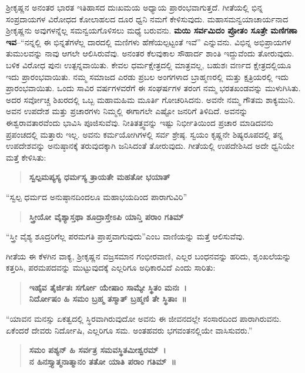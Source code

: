 ಶ‍್ರೀಕೃಷ್ಣನ ಅನಂತರ ಭಾರತ ಇತಿಹಾಸದ ದುಃಖಮಯ ಅಧ್ಯಾಯ ಪ್ರಾರಂಭವಾಗುತ್ತದೆ. ಗೀತೆಯಲ್ಲಿ ಭಿನ್ನ ಸಂಪ್ರದಾಯಗಳ ವಿರೋಧದ ಕೋಲಾಹಲದ ದೂರ ಧ್ವನಿ ನಮಗೆ ಕೇಳಿಸುವುದು. ಮಹಾಸಮನ್ವಯಾಚಾರ್ಯನಾದ ಶ‍್ರೀಕೃಷ್ಣನು ಅವುಗಳನ್ನೆಲ್ಲ ಸಮನ್ವಯಗೊಳಿಸಲು ಮಧ್ಯೆ ಬರುವನು. \textbf{ಮಯಿ ಸರ್ವಮಿದಂ ಪ್ರೋತಂ ಸೂತ್ರೇ ಮಣಿಗಣಾ ಇವ}–“ನನ್ನಲ್ಲಿ ಈ ಭಿನ್ನತೆಗಳೆಲ್ಲ ದಾರದಲ್ಲಿ ಮಣಿಗಳು ಹೆಣೆಯಲ್ಪಟ್ಟಂತೆ ಇವೆ” ಎನ್ನುವನು. ವಿಭಿನ್ನ ಅಭಿಪ್ರಾಯಗಳ ತುಮುಲವನ್ನು ನಾವು ಆಗಲೇ ಆಲಿಸಿರುವೆವು. ಅನಂತರ ಕೆಲವುಕಾಲ ಸೌಹಾರ್ದ ಶಾಂತಿ ಇದ್ದುವೆಂದು ತೋರುವುದು. ಬಳಿಕ ವಿರೋಧ ಪುನಃ ಉತ್ಪನ್ನವಾಯಿತು. ಕೇವಲ ಧರ್ಮಕ್ಷೇತ್ರದಲ್ಲಿ ಮಾತ್ರವಲ್ಲ, ಬಹುಶಃ ವರ್ಣದ ಕ್ಷೇತ್ರದಲ್ಲಿಯೂ ಇದು ಪ್ರಾರಂಭವಾಯಿತು. ನಮ್ಮ ಸಮಾಜದ ಎರಡು ಪ್ರಬಲ ಅಂಗಗಳಾದ ಬ್ರಾಹ್ಮಣರಲ್ಲಿ ಮತ್ತು ಕ್ಷತ್ರಿಯರಲ್ಲಿ ಇದು ಪ್ರಾರಂಭವಾಯಿತು. ಒಂದು ಸಾವಿರ ವರ್ಷಗಳವರೆಗೆ ಈ ಸಂಘರ್ಷಗಳ ತರಂಗ ನಮ್ಮ ಭರತಖಂಡವನ್ನು ಮುಳುಗಿಸಿತು. ಅದರ ಸರ್ವೋಚ್ಚ ಶಿಖರದಲ್ಲಿ ಒಬ್ಬ ಮಹಾಮಹಿಮ ಮೂರ್ತಿ ಗೋಚರಿಸಿದನು. ಅವನೇ ನಮ್ಮ ಗೌತಮ ಶಾಕ್ಯಮುನಿ. ಅವನ ಉಪದೇಶ ಮತ್ತು ಪ್ರಚಾರಗಳು ನಿಮ್ಮಲ್ಲಿ ಈಗಾಗಲೇ ಎಷ್ಟೋ ಜನರಿಗೆ ತಿಳಿದಿದೆ. ಅವನನ್ನು ಈಶ್ವರಾವತಾರವೆಂದು ಭಾವಿಸಿ ಪೂಜಿಸುವೆವು. ನೀತಿತತ್ತ್ವವನ್ನು ಇಷ್ಟು ನಿರ್ಭೀತಿಯಿಂದ ಪ್ರಚಾರ ಮಾಡಿದವನು ಪ್ರಪಂಚದಲ್ಲಿ ಮತ್ತಾರು ಇಲ್ಲ. ಅವನು ಕರ್ಮಯೋಗಿಗಳಲ್ಲಿ ಸರ್ವ ಶ್ರೇಷ್ಠ. ಸ್ವಯಂ ಕೃಷ್ಣನೇ ಶಿಷ್ಯರೂಪದಲ್ಲಿ ತನ್ನ ಉಪದೇಶವನ್ನು ಅನುಷ್ಠಾನಕ್ಕೆ ತರುವುದಕ್ಕಾಗಿ ಜನಿಸಿದಂತೆ ತೋರುವುದು. ಗೀತೆಯಲ್ಲಿ ಉಪದೇಶಿಸಿದ ಅದೇ ಧ್ವನಿಯೇ ಮತ್ತೆ ಕೇಳಿಸಿತು:

\begin{verse}
\textbf{ಸ್ವಲ್ಪಮಪ್ಯಸ್ಯ ಧರ್ಮಸ್ಯ ತ್ರಾಯತೇ ಮಹತೋ ಭಯಾತ್​}
\end{verse}

“ಸ್ವಲ್ಪ ಧರ್ಮದ ಅನುಷ್ಠಾನದಿಂದಲೂ ಮಹಾಭಯದಿಂದ ಪಾರಾಗುವಿರಿ”

\begin{verse}
\textbf{ ಸ್ತ್ರೀಯೋ ವೈಶ್ಯಾಸ್ತಥಾ ಶೂದ್ರಾಸ್ತೇಽಪಿ ಯಾನ್ತಿ ಪರಾಂ ಗತಿಮ್​}
\end{verse}

“ಸ್ತ್ರೀ ವೈಶ್ಯ ಶೂದ್ರರಿಗೆಲ್ಲ ಪರಮಗತಿ ಪ್ರಾಪ್ತವಾಗುವುದು”ಎಂಬ ವಾಣಿಯನ್ನು ಮತ್ತೆ ಆಲಿಸುವೆವು. 

ಗೀತೆಯ ಈ ಕೆಳಗಿನ ವಾಕ್ಯ, ಶ‍್ರೀಕೃಷ್ಣನ ವಜ್ರಸಮಾನ ಗಂಭೀರವಾಣಿ, ಎಲ್ಲರ ಬಂಧನವನ್ನು ಹರಿದು, ಶೃಂಖಲೆಯನ್ನು ಕತ್ತರಿಸಿ, ಪರಮಪದವನ್ನು ಮುಟ್ಟುವುದಕ್ಕೆ ಎಲ್ಲರಿಗೂ ಅಧಿಕಾರವಿದೆ ಎಂದು ಸಾರಿತು:

\begin{verse}
\textbf{ಇಹೈವ ತೈರ್ಜಿತಃ ಸರ್ಗೋ ಯೇಷಾಂ ಸಾಮ್ಯೇ ಸ್ಥಿತಂ ಮನಃ~।}\\\textbf{ನಿರ್ದೋಷಂ ಹಿ ಸಮಂ ಬ್ರಹ್ಮ ತಸ್ಮಾತ್​ ಬ್ರಹ್ಮಣಿ ತೇ ಸ್ಥಿತಾಃ~॥}
\end{verse}

“ಯಾವನ ಮನಸ್ಸು ಏಕತ್ವದಲ್ಲಿ ಸ್ಥಿರವಾಗಿರುವುದೋ ಅವನು ಈ ಜೀವನದಲ್ಲೇ ಸಂಸಾರದಿಂದ ಪಾರಾಗಿರುವನು. ಏಕೆಂದರೆ ದೇವರು ನಿರ್ದೋಷಿ, ಎಲ್ಲರಿಗೂ ಸಮ. ಅಂತಹವರು ಭಗವಂತನಲ್ಲಿಯೇ ವಾಸಿಸುವರು.”

\begin{verse}
\textbf{ಸಮಂ ಪಶ್ಯನ್​ ಹಿ ಸರ್ವತ್ರ ಸಮವಸ್ಥಿತಮೀಶ್ವರಮ್​~।}\\\textbf{ನ ಹಿನಸ್ತ್ಯಾತ್ಮನಾತ್ಮಾನಂ ತತೋ ಯಾತಿ ಪರಾಂ ಗತಿಮ್​~॥}
\end{verse}


